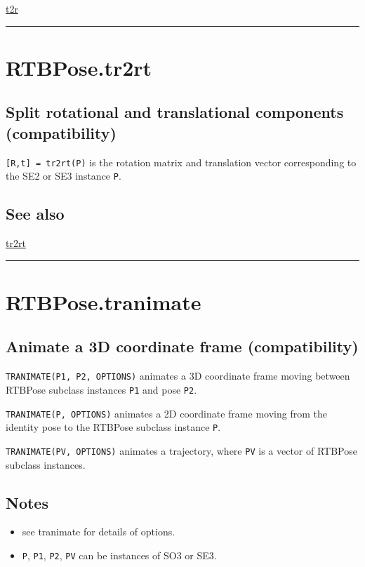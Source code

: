 \hyperlink{t2r}{\color{blue} t2r}

\vspace{1.5ex}\hrule

\hypertarget{RTBPose.tr2rt}{\section*{RTBPose.tr2rt}}
\subsection*{Split rotational and translational components  (compatibility)}


\texttt{[R,t] = tr2rt(P)} is the rotation matrix and translation vector
corresponding to the SE2 or SE3 instance \texttt{P}.


\subsection*{See also}


\hyperlink{tr2rt}{\color{blue} tr2rt}

\vspace{1.5ex}\hrule

\hypertarget{RTBPose.tranimate}{\section*{RTBPose.tranimate}}
\subsection*{Animate a 3D coordinate frame (compatibility)}


\texttt{TRANIMATE(P1, P2, OPTIONS)} animates a 3D coordinate frame moving between
RTBPose subclass instances \texttt{P1} and pose \texttt{P2}.



\texttt{TRANIMATE(P, OPTIONS)} animates a 2D coordinate frame moving from the identity pose
to the RTBPose subclass instance \texttt{P}.



\texttt{TRANIMATE(PV, OPTIONS)} animates a trajectory, where \texttt{PV} is a vector of
RTBPose subclass instances.


\subsection*{Notes}
\begin{itemize}
  \item see tranimate for details of options.
  \item \texttt{P}, \texttt{P1}, \texttt{P2}, \texttt{PV} can be instances of SO3 or SE3.
\end{itemize}

